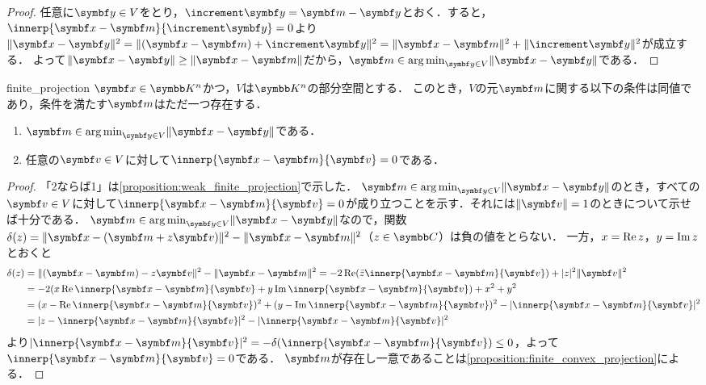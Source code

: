 \documentclass[../../main]{subfiles}
\begin{document}
\begin{proof}
  任意に\(\vect{y}\in V\)をとり，\(\increment\vect{y}=\vect{m}-\vect{y}\)とおく．すると，\(\innerp{\vect{x}-\vect{m}}{\increment\vect{y}}=0\)より
  \(\vnorm{\vect{x}-\vect{y}}^2=\vnorm{(\vect{x}-\vect{m})+\increment\vect{y}}^2=\vnorm{\vect{x}-\vect{m}}^2+\vnorm{\increment\vect{y}}^2\)が成立する．
  よって\(\vnorm{\vect{x}-\vect{y}}\geq\vnorm{\vect{x}-\vect{m}}\)だから，\(\vect{m}\in\argmin_{\vect{y}\in V}\vnorm{\vect{x}-\vect{y}}\)である．
\end{proof}

\begin{proposition}{}{finite_projection}
  \(\vect{x}\in\numset{K}^n\)かつ，\(V\)は\(\numset{K}^n\)の部分空間とする．
  このとき，\(V\)の元\(\vect{m}\)に関する以下の条件は同値であり，条件を満たす\(\vect{m}\)はただ一つ存在する．
  \begin{enumerate}
    \item \(\vect{m}\in\argmin_{\vect{y}\in V}\vnorm{\vect{x}-\vect{y}}\)である．
    \item 任意の\(\vect{v}\in V\)に対して\(\innerp{\vect{x}-\vect{m}}{\vect{v}}=0\)である．
  \end{enumerate}
\end{proposition}

\begin{proof}
  「2ならば1」は\cref{proposition:weak_finite_projection}で示した．
  \(\vect{m}\in\argmin_{\vect{y}\in V}\vnorm{\vect{x}-\vect{y}}\)のとき，すべての\(\vect{v}\in V\)に対して\(\innerp{\vect{x}-\vect{m}}{\vect{v}}=0\)が成り立つことを示す．それには\(\vnorm{\vect{v}}=1\)のときについて示せば十分である．
  \(\vect{m}\in\argmin_{\vect{y}\in V}\vnorm{\vect{x}-\vect{y}}\)なので，関数\(\delta(z)=\vnorm{\vect{x}-(\vect{m}+z\vect{v})}^2-\vnorm{\vect{x}-\vect{m}}^2\)（\(z\in\numset{C}\)）は負の値をとらない．
  一方，\(x=\operatorname{Re} z\)，\(y=\operatorname{Im} z\)とおくと
  \begin{align*}
    \delta(z) &= \vnorm{(\vect{x}-\vect{m})-z\vect{v}}^2-\vnorm{\vect{x}-\vect{m}}^2
    = -2\rpart(\conj{z}\innerp{\vect{x}-\vect{m}}{\vect{v}})+\abs{z}^2\vnorm{\vect{v}}^2 \\
    &= -2(x\rpart\innerp{\vect{x}-\vect{m}}{\vect{v}}+y\ipart\innerp{\vect{x}-\vect{m}}{\vect{v}})+x^2+y^2 \\
    &= (x-\rpart\innerp{\vect{x}-\vect{m}}{\vect{v}})^2+(y-\ipart\innerp{\vect{x}-\vect{m}}{\vect{v}})^2-\abs{\innerp{\vect{x}-\vect{m}}{\vect{v}}}^2 \\
    &= \abs{z-\innerp{\vect{x}-\vect{m}}{\vect{v}}}^2-\abs{\innerp{\vect{x}-\vect{m}}{\vect{v}}}^2
  \end{align*}
  より\(\abs{\innerp{\vect{x}-\vect{m}}{\vect{v}}}^2=-\delta(\innerp{\vect{x}-\vect{m}}{\vect{v}})\leq 0\)，よって\(\innerp{\vect{x}-\vect{m}}{\vect{v}}=0\)である．
  \(\vect{m}\)が存在し一意であることは\cref{proposition:finite_convex_projection}による．
\end{proof}
\end{document}
